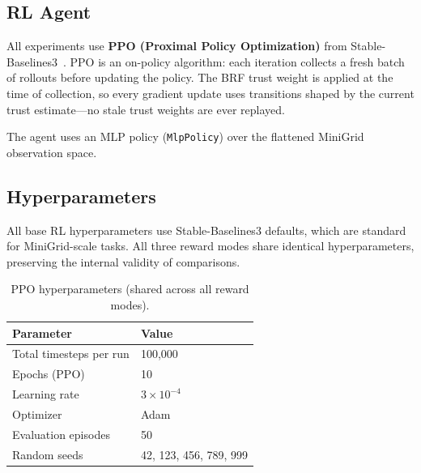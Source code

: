 \documentclass[11pt]{article}
\begin{document}
\subsection{RL Agent}

All experiments use \textbf{PPO (Proximal Policy Optimization)} from
Stable-Baselines3~\cite{raffin2021stable}. PPO is an on-policy algorithm:
each iteration collects a fresh batch of rollouts before updating the policy.
The BRF trust weight is applied at the time of collection, so every gradient
update uses transitions shaped by the current trust estimate---no stale trust
weights are ever replayed.

The agent uses an MLP policy (\texttt{MlpPolicy}) over the flattened
MiniGrid observation space.

\subsection{Hyperparameters}

All base RL hyperparameters use Stable-Baselines3 defaults, which are
standard for MiniGrid-scale tasks. All three reward modes share identical
hyperparameters, preserving the internal validity of comparisons.

\begin{table}[H]
  \centering
  \caption{PPO hyperparameters (shared across all reward modes).}
  \label{tab:base_hp}
  \begin{tabular}{@{}ll@{}}
    \toprule
    Parameter                  & Value              \\
    \midrule
    Total timesteps per run    & 100{,}000          \\
    Epochs (PPO)               & 10                 \\
    Learning rate              & $3\times10^{-4}$   \\
    Optimizer                  & Adam               \\
    Evaluation episodes        & 50                 \\
    Random seeds               & 42, 123, 456, 789, 999 \\
    \bottomrule
  \end{tabular}
\end{table}
\end{document}
